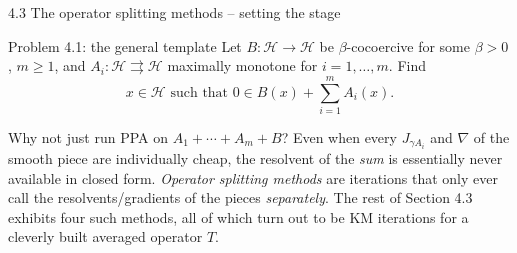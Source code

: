 \documentclass[aspectratio=169,10pt]{beamer}
\begin{document}
\begin{frame}{4.3 The operator splitting methods -- setting the stage}
  \begin{block}{Problem 4.1: the general template}
    Let $B:\mathcal H\to\mathcal H$ be $\beta$-cocoercive for some $\beta>0$, $m\ge1$, and $A_i:\mathcal H\rightrightarrows\mathcal H$ maximally monotone for $i=1,\dots,m$. Find
    \begin{equation*}
      x\in\mathcal H \text{ such that } 0\in B(x)+\sum_{i=1}^m A_i(x). \tag{4.5}
    \end{equation*}
  \end{block}
  \begin{block}{Why not just run PPA on $A_1+\cdots+A_m+B$?}
    Even when every $J_{\gamma A_i}$ and $\nabla$ of the smooth piece are individually cheap, the resolvent of the \emph{sum} is essentially never available in closed form. \emph{Operator splitting methods} are iterations that only ever call the resolvents/gradients of the pieces \emph{separately}. The rest of Section 4.3 exhibits four such methods, all of which turn out to be KM iterations for a cleverly built averaged operator $T$.
  \end{block}
\end{frame}
\end{document}
